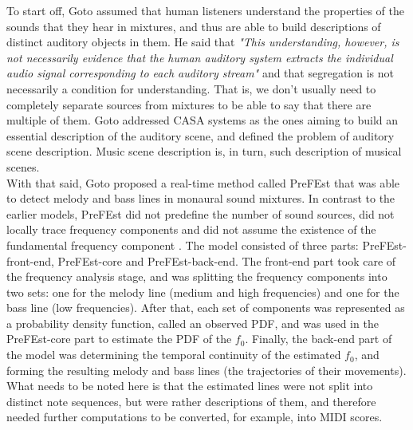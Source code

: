 To start off, Goto assumed that human listeners understand the properties of the sounds that they hear in mixtures, and thus are able to build descriptions of distinct auditory objects in them. He said that \textit{"This understanding, however, is not necessarily evidence that the human auditory system extracts the individual audio signal corresponding to each auditory stream"} \cite{Goto2004} and that segregation is not necessarily a condition for understanding. That is, we don't usually need to completely separate sources from mixtures to be able to say that there are multiple of them. Goto addressed CASA systems as the ones aiming to build an essential description of the auditory scene, and defined the problem of auditory scene description. Music scene description is, in turn, such description of musical scenes.\\

With that said, Goto proposed a real-time method called PreFEst that was able to detect melody and bass lines in monaural sound mixtures. In contrast to the earlier models, PreFEst did not predefine the number of sound sources, did not locally trace frequency components and did not assume the existence of the fundamental frequency component \cite{Goto2004}\cite{Wang2006}. The model consisted of three parts: PreFEst-front-end, PreFEst-core and PreFEst-back-end. The front-end part took care of the frequency analysis stage, and was splitting the frequency components into two sets: one for the melody line (medium and high frequencies) and one for the bass line (low frequencies). After that, each set of components was represented as a probability density function, called an observed PDF, and was used in the PreFEst-core part to estimate the PDF of the $f_0$. Finally, the back-end part of the model was determining the temporal continuity of the estimated $f_0$, and forming the resulting melody and bass lines (the trajectories of their movements). What needs to be noted here is that the estimated lines were not split into distinct note sequences, but were rather descriptions of them, and therefore needed further computations to be converted, for example, into MIDI scores.\\

